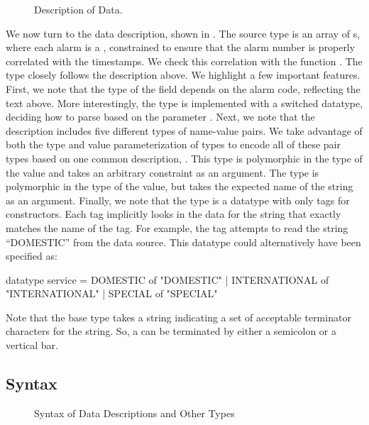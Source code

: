 \begin{figure}
  \centering
  \small
  
  \caption{Description of \darkstar{} Data.}
  \label{fig:darkstar-ml}
\end{figure}
We now turn to the data description, shown in .
The source type is an array of s, where each alarm is a
, constrained to ensure that the alarm number is
properly correlated with the timestamps.  We check this correlation
with the function .  The type  closely
follows the description above. We highlight a few important features.
First, we note that the type of the field  depends on the
alarm code, reflecting the text above. More interestingly, the type
 is implemented with a switched datatype, deciding how to
parse based on the parameter .  Next, we note that the
description includes five different types of name-value pairs. We take
advantage of both the type and value parameterization of types to
encode all of these pair types based on one common description,
. This type is polymorphic in the type of the value and takes
an arbitrary constraint  as an argument. The type  is
polymorphic in the type of the value, but takes the expected name of
the string as an argument. Finally, we note that the type 
is a datatype with only tags for constructors.  Each tag implicitly
looks in the data for the string that exactly matches the name of the
tag. For example, the tag  attempts to read the string
``DOMESTIC'' from the data source. This datatype could alternatively
have been specified as:
\begin{code}
datatype service =
    DOMESTIC      of "DOMESTIC"
  | INTERNATIONAL of "INTERNATIONAL"
  | SPECIAL       of "SPECIAL"
\end{code}

Note that the base type  takes a string indicating a set
of acceptable terminator characters for the string. So, a
 can be terminated by either a semicolon or a
vertical bar.

\subsection{Syntax}

\begin{figure}
  \centering
  
  \caption{Syntax of Data Descriptions and Other Types}
  \label{fig:syntax-dd}
\end{figure}

